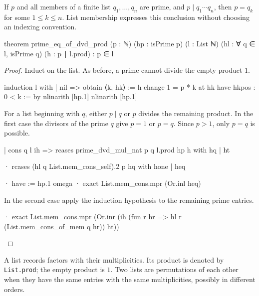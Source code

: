 \begin{corollary}
  \label{ent:cor:prime-in-prime-product}
  If $p$ and all members of a finite list $q_1,\ldots,q_n$ are prime, and $p\mid q_1\cdots q_n$,
  then $p=q_k$ for some $1\le k\le n$.
  List membership expresses this conclusion without choosing an indexing convention.

  \begin{lean}
    theorem prime_eq_of_dvd_prod (p : ℕ) (hp : isPrime p) (l : List ℕ)
        (hl : ∀ q ∈ l, isPrime q) (h : p ∣ l.prod) : p ∈ l
  \end{lean}
\end{corollary}

\begin{proof}
  Induct on the list.
  As before, a prime cannot divide the empty product $1$.

  \begin{lean}
    induction l with
    | nil =>
      obtain ⟨k, hk⟩ := h
      change 1 = p * k at hk
      have hkpos : 0 < k := by
        nlinarith [hp.1]
      nlinarith [hp.1]
  \end{lean}

  For a list beginning with $q$, either $p\mid q$ or $p$ divides the remaining product.
  In the first case the divisors of the prime $q$ give $p=1$ or $p=q$.
  Since $p>1$, only $p=q$ is possible.

  \begin{lean}
    | cons q l ih =>
      rcases prime_dvd_mul_nat p q l.prod hp h with hq | ht

      · rcases (hl q List.mem_cons_self).2 p hq with hone | heq

        · have := hp.1
          omega
        · exact List.mem_cons.mpr (Or.inl heq)
  \end{lean}

  In the second case apply the induction hypothesis to the remaining prime entries.

  \begin{lean}
    · exact List.mem_cons.mpr
        (Or.inr (ih (fun r hr => hl r (List.mem_cons_of_mem q hr)) ht))
  \end{lean}

\end{proof}

A list records factors with their multiplicities.
Its product is denoted by \texttt{List.prod}; the empty product is $1$.
Two lists are permutations of each other when they have the same entries with the same
multiplicities, possibly in different orders.

